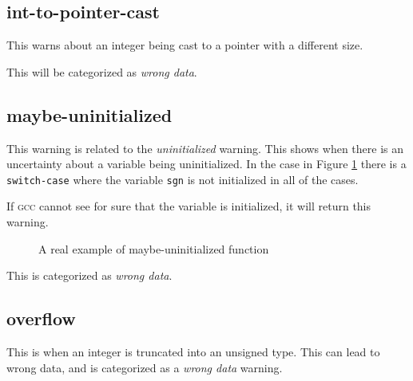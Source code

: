\documentclass[a4paper,11pt]{report}
\newcommand{\textcode}[1]{\fboxsep=1pt\texttt{\colorbox{gray!20}{#1}}}
\newcommand{\figa}{
    \begin{figure}[!htpb]
    \centering
}
\newcommand{\figb}[2]{
    \caption{#1}
    \label{#2}
    \end{figure}
}
\begin{document}
            \subsection*{int-to-pointer-cast}
This warns about an integer being cast to a pointer with a different size.

This will be categorized as \emph{wrong data}.


            %


            \subsection*{maybe-uninitialized}
This warning is related to the \emph{uninitialized} warning. This shows when 
there is an uncertainty about a variable being uninitialized. In the 
case in Figure \ref{lst:maybeuninitializedreal} there is a \texttt{switch-case} 
where the variable \textcode{sgn} is not initialized in all of the cases.

If \textsc{gcc} cannot see for sure that the variable is initialized, it will 
return this warning.

\figa
    \subfigure{
        
    }
\figb{A real example of maybe-uninitialized function}{lst:maybeuninitializedreal}

This is categorized as \emph{wrong data}.


            \subsection*{overflow}
This is when an integer is truncated into an unsigned type. This can lead to 
wrong data, and is categorized as a \emph{wrong data} warning.
\end{document}
